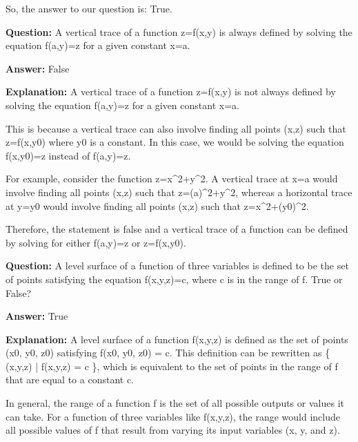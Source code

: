 \documentclass{article}
\begin{document}
So, the answer to our question is: True.
                
                \vspace{0.5cm} 
        
            
                \textbf {Question:} A vertical trace of a function z=f(x,y) is always defined by solving the equation f(a,y)=z for a given constant x=a.
                
                \textbf{Answer:} False

                \textbf{Explanation:} A vertical trace of a function z=f(x,y) is not always defined by solving the equation f(a,y)=z for a given constant x=a.

This is because a vertical trace can also involve finding all points (x,z) such that z=f(x,y0) where y0 is a constant. In this case, we would be solving the equation f(x,y0)=z instead of f(a,y)=z.

For example, consider the function z=x{\textasciicircum}2+y{\textasciicircum}2. A vertical trace at x=a would involve finding all points (x,z) such that z=(a){\textasciicircum}2+y{\textasciicircum}2, whereas a horizontal trace at y=y0 would involve finding all points (x,z) such that z=x{\textasciicircum}2+(y0){\textasciicircum}2.

Therefore, the statement is false and a vertical trace of a function can be defined by solving for either f(a,y)=z or z=f(x,y0).
                
                \vspace{0.5cm} 
        
            
                \textbf {Question:} A level surface of a function of three variables is defined to be the set of points satisfying the equation f(x,y,z)=c, where c is in the range of f. True or False?
                
                \textbf{Answer:} True

                \textbf{Explanation:} A level surface of a function f(x,y,z) is defined as the set of points (x0, y0, z0) satisfying f(x0, y0, z0) = c. This definition can be rewritten as \{ (x,y,z) | f(x,y,z) = c \}, which is equivalent to the set of points in the range of f that are equal to a constant c.

In general, the range of a function f is the set of all possible outputs or values it can take. For a function of three variables like f(x,y,z), the range would include all possible values of f that result from varying its input variables (x, y, and z).
\end{document}
